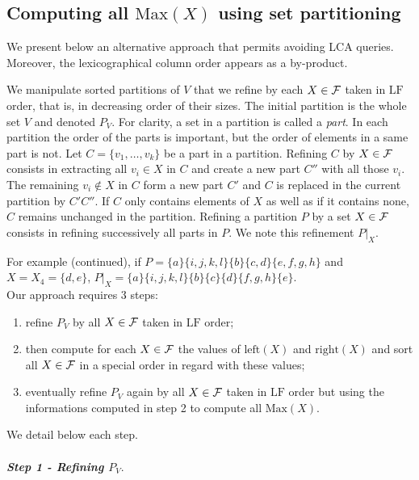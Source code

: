 \documentclass{llncs}
\begin{document}
\subsection{Computing all $\mbox{Max}(X)$ using set partitioning}
\label{partitions}

We present below an alternative approach that permits avoiding LCA
queries. Moreover, the lexicographical column order appears 
as a by-product.

We manipulate sorted partitions of $V$ that we refine by each $X \in
{\cal F}$ taken in $\mbox{LF}$ order, that is, in decreasing order of
their sizes. The initial partition is the whole set $V$ and denoted
$P_V$.  For clarity, a set in a partition is called a {\em part}. In
each partition the order of the parts is important, but the order of
elements in a same part is not. Let $C=\{v_1,\ldots,v_k\}$ be a part
in a partition. Refining $C$ by $X \in {\cal F}$ consists in
extracting all $v_i \in X$ in $C$ and create a new part $C''$ with all
those $v_i$. The remaining $v_i \not\in X$ in $C$ form a new part $C'$
and $C$ is replaced in the current partition by $C'C''$. If $C$ only
contains elements of $X$ as well as if it contains none, $C$ remains
unchanged in the partition. Refining a partition $P$ by a set $X \in
{\cal F}$ consists in refining successively all parts in $P$. We note
this refinement $P|_X.$

For example (continued), if
$P=\{a\}\{i,j,k,l\}\{b\}\{c,d\}\{e,f,g,h\}$ and $X = X_4 =
\{d,e\}$, $P|_X = \{a\}\{i,j,k,l\}\{b\}\{c\}\{d\}\{f,g,h\}\{e\}.$\\


\noindent
Our approach requires 3 steps:
\begin{enumerate}
\item refine $P_V$ by all $X \in {\cal F}$ taken in
  $\mbox{LF}$ order;
\item then compute for each $X \in {\cal F}$ the values of
  $\mbox{left}(X)$ and $\mbox{right}(X)$ and sort all $X \in {\cal
  F}$ in a special order in regard with these values;
\item eventually refine $P_V$ again by all $X \in {\cal F}$
taken in $\mbox{LF}$ order but using the informations computed in step
2 to compute all $\mbox{Max}(X).$
\end{enumerate}
\noindent
We detail below each step. 

\paragraph{\bf \em Step 1 \-- Refining $P_V.$}
\end{document}
